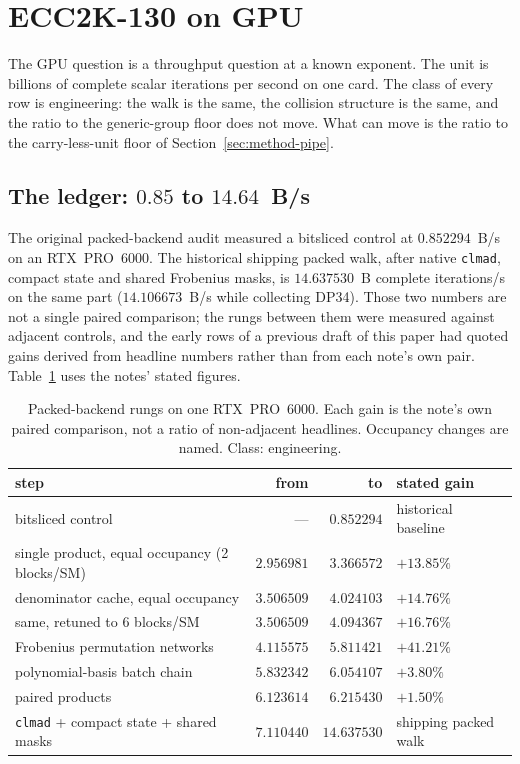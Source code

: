 \section{ECC2K-130 on GPU}
\label{sec:ecc2k-gpu}

The GPU question is a throughput question at a known exponent. The
unit is billions of complete scalar iterations per second on one card.
The class of every row is engineering: the walk is the same, the
collision structure is the same, and the ratio to the generic-group
floor does not move. What can move is the ratio to the carry-less-unit
floor of Section~\ref{sec:method-pipe}.

\subsection{The ledger: $0.85$ to $14.64$~B/s}
\label{sec:gpu-ledger}

The original packed-backend audit measured a bitsliced control at
$0.852294$~B/s on an RTX~PRO~6000.
The historical shipping packed walk, after native \texttt{clmad},
compact state and shared Frobenius masks, is $14.637530$~B complete
iterations/s on the same part ($14.106673$~B/s while collecting
DP34). Those two numbers are
not a single paired comparison; the rungs between them were measured
against adjacent controls, and the early rows of a previous draft of
this paper had quoted gains derived from headline numbers rather than
from each note's own pair. Table~\ref{tab:gpu-rungs} uses the notes'
stated figures.

\begin{table}[t]
\centering
\small
\caption{Packed-backend rungs on one RTX~PRO~6000. Each gain is
  the note's own paired comparison, not a ratio of non-adjacent
  headlines. Occupancy changes are named. Class: engineering.}
\label{tab:gpu-rungs}
\begin{tabular}{@{}p{}rrl@{}}
\toprule
step & from & to & stated gain \\
\midrule
bitsliced control
  & --- & $0.852294$ & historical baseline \\
single product, equal occupancy (2 blocks/SM)
  & $2.956981$ & $3.366572$ & $+13.85\%$ \\
denominator cache, equal occupancy
  & $3.506509$ & $4.024103$ & $+14.76\%$ \\
\quad same, retuned to 6 blocks/SM
  & $3.506509$ & $4.094367$ & $+16.76\%$ \\
Frobenius permutation networks
  & $4.115575$ & $5.811421$ & $+41.21\%$ \\
polynomial-basis batch chain
  & $5.832342$ & $6.054107$ & $+3.80\%$ \\
paired products
  & $6.123614$ & $6.215430$ & $+1.50\%$ \\
\texttt{clmad} + compact state + shared masks
  & $7.110440$ & $14.637530$ & shipping packed walk \\
\bottomrule
\end{tabular}
\end{table}

